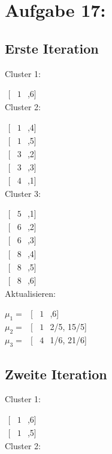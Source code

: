 \section{Aufgabe 17:}

\newcommand{\matc}[2]{
	\begin{figure}
		\centering
		$
		\begin{matrix}
				#1 &#2
		\end{matrix}
		$	
	\end{figure}
}
\newcommand{\mat}[2]{
		$
		\begin{matrix}
				#1 & #2
		\end{matrix}
		$	
}

\subsection{Erste Iteration}

Cluster 1:

\mat[1,6]\\

Cluster 2:

\mat[1,4]\\
\mat[1,5]\\
\mat[3,2]\\
\mat[3,3]\\
\mat[4,1]\\

Cluster 3:

\mat[5,1]\\
\mat[6,2]\\
\mat[6,3]\\
\mat[8,4]\\
\mat[8,5]\\
\mat[8,6]\\

Aktualisieren:

$\mu_1 = $\mat[1,6]\\
$\mu_2 = $\mat[12/5, 15/5]\\
$\mu_3 = $\mat[41/6, 21/6]\\


\subsection{Zweite Iteration}

Cluster 1:

\mat[1,6]\\
\mat[1,5]\\

Cluster 2:


